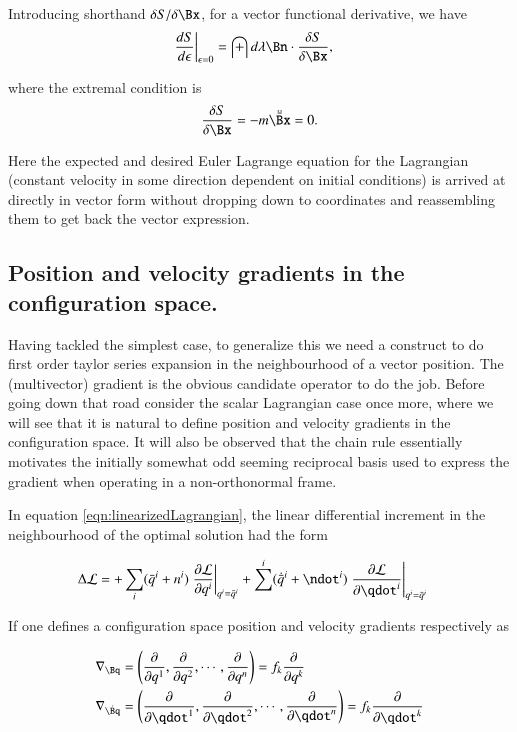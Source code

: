 \documentclass{article}
\newcommand{\qbar}[0]{\bar{q}}
\newcommand{\qdotbar}[0]{\dot{\bar{q}}}
\begin{document}
Introducing shorthand $\delta S/\delta \Bx$, for a vector functional derivative, we have
\begin{align*}
\left.\frac{d S}{d\epsilon}\right\vert_{\epsilon=0} &= \int d\lambda \Bn \cdot \frac{\delta S}{\delta \Bx},
\end{align*}

where the extremal condition is
\begin{align*}
\frac{\delta S}{\delta \Bx} = - m \ddot{\bar{\Bx}} = 0.
\end{align*}

Here the expected and desired Euler Lagrange equation for the Lagrangian (constant velocity in some direction dependent on initial conditions) is arrived at directly in vector form without dropping down to coordinates and reassembling them to get back the vector expression.

\subsection{ Position and velocity gradients in the configuration space. }

Having tackled the simplest case, to generalize this we need a construct to do first order taylor series expansion in the neighbourhood of a vector
position.  The (multivector) gradient is the obvious candidate operator to do the job.
Before going down that road consider the scalar Lagrangian case once more, where we will see that it is natural to define position and velocity gradients
in the configuration space.  It will also be observed that the chain rule essentially motivates the initially somewhat odd seeming reciprocal basis
used to express the gradient when operating in a non-orthonormal frame.

In equation \ref{eqn:linearizedLagrangian}, the linear differential increment in the neighbourhood of the optimal solution had the form

\begin{align}\label{eqn:gradientMotivator}
\Delta \LL &=
+ \sum_i (\qbar^i + n^i) \left. \PD{q^i}{\LL} \right\vert_{q^i = \qbar^i}
+ \sum^i (\qdotbar^i + \ndot^i) \left. \PD{\qdot^i}{\LL} \right\vert_{q^i = \qbar^i}
\end{align}

If one defines a configuration space position and velocity gradients respectively as

\begin{align*}
\grad_{\Bq} &= \left(\PD{q^1}{}, \PD{q^2}{}, \cdots, \PD{q^n}{}\right) = f_k \PD{q^k}{} \\
\grad_{\dot{\Bq}} &= \left(\PD{\qdot^1}{}, \PD{\qdot^2}{}, \cdots, \PD{\qdot^n}{}\right) = f_k \PD{\qdot^k}{}
\end{align*}
\end{document}
